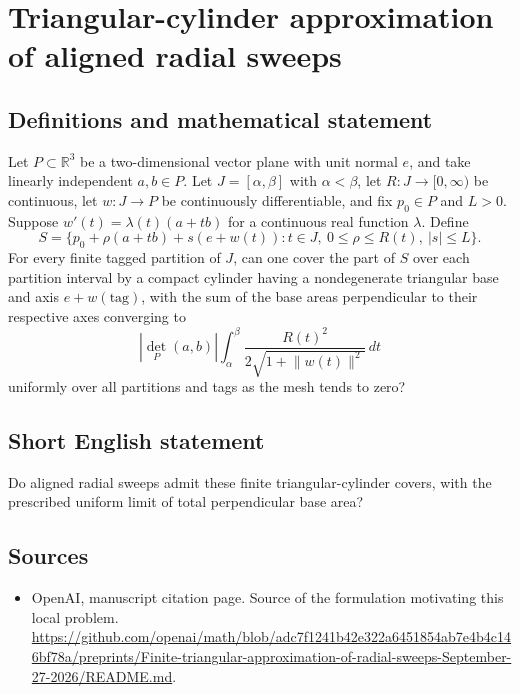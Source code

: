 \documentclass[11pt]{article}
\begin{document}
\section*{Triangular-cylinder approximation of aligned radial sweeps}\label{statement}
\subsection{Definitions and mathematical statement}
Let $P\subset\mathbb R^3$ be a two-dimensional vector plane with unit normal $e$, and take linearly independent $a,b\in P$. Let $J=[\alpha,\beta]$ with $\alpha<\beta$, let $R:J\to[0,\infty)$ be continuous, let $w:J\to P$ be continuously differentiable, and fix $p_0\in P$ and $L>0$. Suppose $w'(t)=\lambda(t)(a+tb)$ for a continuous real function $\lambda$. Define
\[
 S=\{p_0+\rho(a+tb)+s(e+w(t)):t\in J,\ 0\le\rho\le R(t),\ |s|\le L\}.
\]
For every finite tagged partition of $J$, can one cover the part of $S$ over each partition interval by a compact cylinder having a nondegenerate triangular base and axis $e+w(\text{tag})$, with the sum of the base areas perpendicular to their respective axes converging to
\[
 |\det_P(a,b)|\int_\alpha^\beta
 \frac{R(t)^2}{2\sqrt{1+\lVert w(t)\rVert^2}}\,dt
\]
uniformly over all partitions and tags as the mesh tends to zero?

\subsection{Short English statement}
Do aligned radial sweeps admit these finite triangular-cylinder covers, with the prescribed uniform limit of total perpendicular base area?

\subsection{Sources}
\begin{itemize}
\item[S1] OpenAI, manuscript citation page. Source of the formulation motivating this local problem.
\url{https://github.com/openai/math/blob/adc7f1241b42e322a6451854ab7e4b4c146bf78a/preprints/Finite-triangular-approximation-of-radial-sweeps-September-27-2026/README.md}.
\end{itemize}
\end{document}
